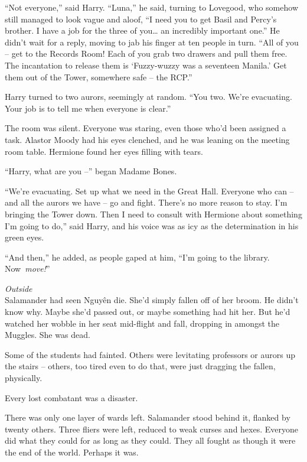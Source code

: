 ``Not everyone,'' said Harry. ``Luna,'' he said, turning to Lovegood,
who somehow still managed to look vague and aloof, ``I need you to get
Basil and Percy's brother. I have a job for the three of you\ldots{} an
incredibly important one.'' He didn't wait for a reply, moving to jab
his finger at ten people in turn. ``All of you -- get to the Records
Room! Each of you grab two drawers and pull them free. The incantation
to release them is `Fuzzy-wuzzy was a seventeen Manila.' Get them out of
the Tower, somewhere safe -- the RCP.''

Harry turned to two aurors, seemingly at random. ``You two. We're
evacuating. Your job is to tell me when everyone is clear.''

The room was silent. Everyone was staring, even those who'd been
assigned a task. Alastor Moody had his eyes clenched, and he was leaning
on the meeting room table. Hermione found her eyes filling with tears.

``Harry, what are you --'' began Madame Bones.

``We're evacuating. Set up what we need in the Great Hall. Everyone who
can -- and all the aurors we have -- go and fight. There's no more
reason to stay. I'm bringing the Tower down. Then I need to consult with
Hermione about something I'm going to do,'' said Harry, and his voice
was as icy as the determination in his green eyes.

``And then,'' he added, as people gaped at him, ``I'm going to the
library. Now~\emph{move!}''

\mybreak

\emph{Outside}\\

Salamander had seen Nguy\makebox[0pt][l]{\raisebox{0.5ex}{˜}}ên die.
She'd simply fallen off of her broom. He didn't know why. Maybe she'd
passed out, or maybe something had hit her. But he'd watched her wobble
in her seat mid-flight and fall, dropping in amongst the Muggles. She
was dead.

Some of the students had fainted. Others were levitating professors or
aurors up the stairs -- others, too tired even to do that, were just
dragging the fallen, physically.

Every lost combatant was a disaster.

There was only one layer of wards left. Salamander stood behind it,
flanked by twenty others. Three fliers were left, reduced to weak curses
and hexes. Everyone did what they could for as long as they could. They
all fought as though it were the end of the world. Perhaps it was.

